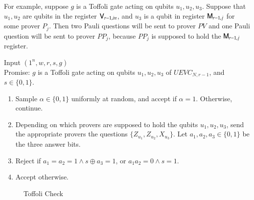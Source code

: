 For example, suppose $g$ is a Toffoli gate acting on qubits $u_1,u_2,u_3$. Suppose that $u_1,u_2$ are qubits in the register ${\textsf{V}}_{r-1,in}$, and $u_3$ is a qubit in register ${\textsf{M}}_{r-1,j}$ for some prover $P_j$. Then two Pauli questions will be sent to prover $PV$ and one Pauli question will be sent to prover $PP_j$, because $PP_j$ is supposed to hold the ${\textsf{M}}_{r-1,j}$ register. 

\vspace{10pt}
\begin{center}
\begin{mdframed}
	Input $(1^n,w,r,s,g)$ \\
	Promise: $g$ is a Toffoli gate acting on qubits $u_1,u_2,u_3$ of $UEVC_{N,r-1}$, and $s \in \{0,1\}$.
    
	\begin{enumerate}
		\item Sample $\alpha \in \{0,1\}$ uniformly at random, and accept if $\alpha = 1$. Otherwise, continue.
		\item Depending on which provers are supposed to hold the qubits $u_1,u_2,u_3$, send the appropriate provers the questions $\{Z_{u_1}, Z_{u_2}, X_{u_3} \}$. Let $a_1,a_2,a_3 \in \{0,1\}$ be the three answer bits. 
		\item Reject if $a_1 = a_2 = 1 \wedge s \oplus a_3 = 1$, or $a_1 a_2 = 0 \wedge s = 1$.
		\item Accept otherwise.
	\end{enumerate}    
\end{mdframed}

\end{center}
\begin{figure}[H]
\caption{Toffoli Check}
\label{fig:toffoli_check}
\end{figure}



